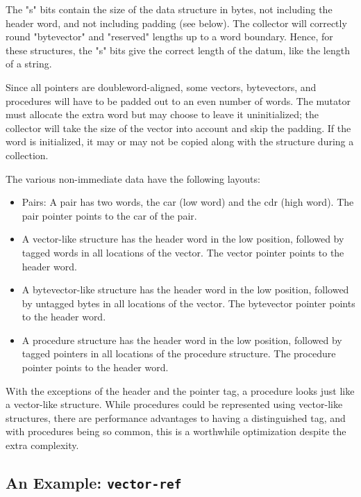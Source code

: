 The "s" bits contain the size of the data structure in bytes, not
including the header word, and not including padding (see below). The
collector will correctly round "bytevector" and "reserved" lengths up
to a word boundary. Hence, for these structures, the "s" bits give the
correct length of the datum, like the length of a string.

Since all pointers are doubleword-aligned, some vectors, bytevectors,
and procedures will have to be padded out to an even number of words.
The mutator must allocate the extra word but may choose to leave it
uninitialized; the collector will take the size of the vector into
account and skip the padding. If the word is initialized, it may or
may not be copied along with the structure during a collection.

The various non-immediate data have the following layouts:

\begin{itemize}
\item
Pairs: A pair has two words, the car (low word) and the cdr (high word).
The pair pointer points to the car of the pair.

\item
A vector-like structure has the header word in the low position, followed
by tagged words in all locations of the vector. The vector pointer
points to the header word.

\item
A bytevector-like structure has the header word in the low position,
followed by untagged bytes in all locations of the vector. The bytevector
pointer points to the header word.

\item
A procedure structure has the header word in the low position, followed by
tagged pointers in all locations of the procedure structure. The procedure
pointer points to the header word.
\end{itemize}

With the exceptions of the header and the pointer tag, a procedure looks
just like a vector-like structure. While procedures could be represented
using vector-like structures, there are performance advantages to having a
distinguished tag, and with procedures being so common, this is a worthwhile
optimization despite the extra complexity.

\subsection{An Example: {\tt vector-ref}}

